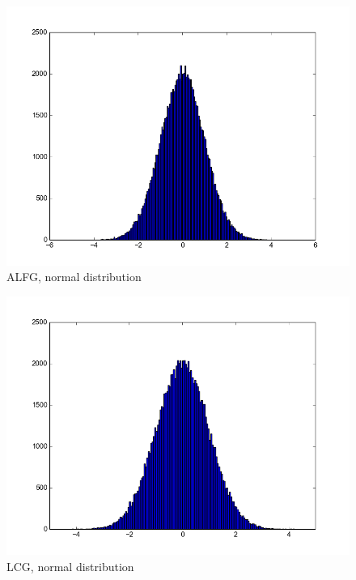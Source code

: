 \documentclass[reprint,aip]{revtex4-1}
\begin{document}
\begin{figure}[h]
\includegraphics{normal-alfg.png}
\caption{ALFG, normal distribution}
\end{figure}

\begin{figure}[h]
\includegraphics{normal-lcg.png}
\caption{LCG, normal distribution}
\end{figure}
\end{document}
